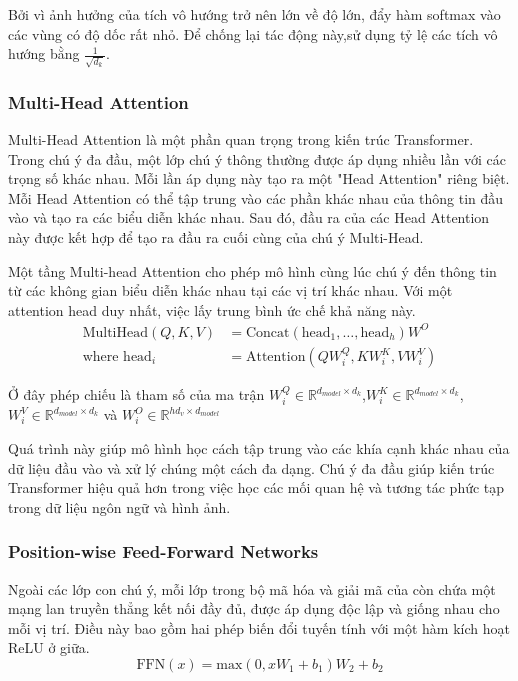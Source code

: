 Bởi vì ảnh hưởng của tích vô hướng trở nên lớn về độ lớn, đẩy hàm softmax vào các vùng có độ dốc rất nhỏ.  Để chống lại tác động này,sử dụng tỷ lệ các tích vô hướng bằng \(\frac{1}{\sqrt{d_k}}\).

\subsubsection*{Multi-Head Attention}
Multi-Head Attention là một phần quan trọng trong kiến trúc Transformer. Trong chú ý đa đầu, một lớp chú ý thông thường được áp dụng nhiều lần với các trọng số khác nhau. Mỗi lần áp dụng này tạo ra một "Head Attention" riêng biệt. Mỗi Head Attention có thể tập trung vào các phần khác nhau của thông tin đầu vào và tạo ra các biểu diễn khác nhau. Sau đó, đầu ra của các Head Attention này được kết hợp để tạo ra đầu ra cuối cùng của chú ý Multi-Head.

Một tầng Multi-head Attention cho phép mô hình cùng lúc chú ý đến thông tin từ các không gian biểu diễn khác nhau tại các vị trí khác nhau. Với một attention head duy nhất, việc lấy trung bình ức chế khả năng này\cite{vaswani2023attention}.
\begin{align*}
    \text{MultiHead}(Q, K, V) &= \text{Concat}(\text{head}_1, \ldots, \text{head}_h)W^O \\
    \text{where head}_i &= \text{Attention}(QW_i^Q, KW_i^K, VW_i^V)
\end{align*}

Ở đây phép chiếu là tham số của ma trận $W_i^Q \in \mathbb{R}^{d_{model} \times d_k}$,$ W_i^K \in \mathbb{R}^{d_{model} \times d_k}$, $W_i^V \in \mathbb{R}^{d_{model} \times d_k}$ và $W_i^O \in \mathbb{R}^{hd_v \times d_{model}}$

Quá trình này giúp mô hình học cách tập trung vào các khía cạnh khác nhau của dữ liệu đầu vào và xử lý chúng một cách đa dạng. Chú ý đa đầu giúp kiến trúc Transformer hiệu quả hơn trong việc học các mối quan hệ và tương tác phức tạp trong dữ liệu ngôn ngữ và hình ảnh.

\subsubsection*{Position-wise Feed-Forward Networks}
Ngoài các lớp con chú ý, mỗi lớp trong bộ mã hóa và giải mã của còn chứa một mạng lan truyền thẳng kết nối đầy đủ, được áp dụng độc lập và giống nhau cho mỗi vị trí. Điều này bao gồm hai phép biến đổi tuyến tính với một hàm kích hoạt ReLU ở giữa.
\[
    \text{FFN}(x) = \text{max}(0, xW_1 + b_1)W_2 + b_2    
\]


